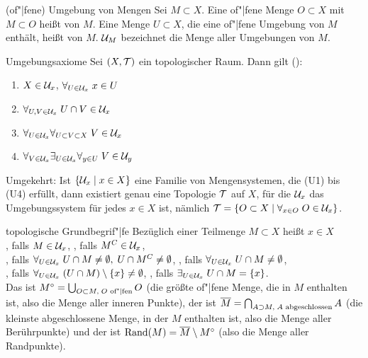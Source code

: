 \begin{Def}{(of"|fene) Umgebung von Mengen}
    Sei $M \subset X$.
    Eine of"|fene Menge $O \subset X$ mit $M \subset O$ heißt
     von $M$.
    Eine Menge $U \subset X$, die eine of"|fene Umgebung von $M$ enthält,
    heißt  von $M$.
    $\mathcal{U}_M$ bezeichnet die Menge aller Umgebungen von $M$.
\end{Def}

\linie

\begin{Satz}{Umgebungsaxiome}
    Sei $(X, \mathcal{T})$ ein topologischer Raum.
    Dann gilt ():
    \begin{enumerate}[label=(U\arabic*)]
        \item
        $X \in \mathcal{U}_x$, $\forall_{U \in \mathcal{U}_x}\; x \in U$
        
        \item
        $\forall_{U, V \in \mathcal{U}_x}\; U \cap V \in \mathcal{U}_x$
        
        \item
        $\forall_{U \in \mathcal{U}_x} \forall_{U \subset V \subset X}\; V \in \mathcal{U}_x$
        
        \item
        $\forall_{V \in \mathcal{U}_x} \exists_{U \in \mathcal{U}_x} \forall_{y \in U}\;
        V \in \mathcal{U}_y$
    \end{enumerate}
    Umgekehrt:
    Ist $\{\mathcal{U}_x \;|\; x \in X\}$ eine Familie von Mengensystemen,
    die (U1) bis (U4) erfüllt,
    dann existiert genau eine Topologie $\mathcal{T}$ auf $X$, für die
    $\mathcal{U}_x$ das Umgebungssystem für jedes $x \in X$ ist, nämlich
    $\mathcal{T} = \{O \subset X \;|\; \forall_{x \in O}\; O \in \mathcal{U}_x\}$.
\end{Satz}

\linie

\begin{Def}{topologische Grundbegrif"|fe}
    Bezüglich einer Teilmenge $M \subset X$ heißt $x \in X$ \\
    , falls $M \in \mathcal{U}_x$, \qquad
    , falls $M^C \in \mathcal{U}_x$, \\
    , falls $\forall_{U \in \mathcal{U}_x}\; U \cap M \not= \emptyset,\;
    U \cap M^C \not= \emptyset$, \qquad
    , falls
    $\forall_{U \in \mathcal{U}_x}\; U \cap M \not= \emptyset$, \\
    , falls $\forall_{U \in \mathcal{U}_x}\;
    (U \cap M) \setminus \{x\} \not= \emptyset$, \qquad
    , falls
    $\exists_{U \in \mathcal{U}_x}\; U \cap M = \{x\}$. \\
    Das  ist
    ${M}^\circ = \bigcup_{O \subset M,\; O \text{ of"|fen}} O$
    (die größte of"|fene Menge, die in $M$ enthalten ist,
    also die Menge aller inneren Punkte),
    der  ist 
    $\overline{M} = \bigcap_{A \supset M,\; A \text{ abgeschlossen}} A$
    (die kleinste abgeschlossene Menge, in der $M$ enthalten ist,
    also die Menge aller Berührpunkte)
    und der  ist $\operatorname{Rand}(M) = \overline{M} \setminus {M}^\circ$
    (also die Menge aller Randpunkte).
\end{Def}

